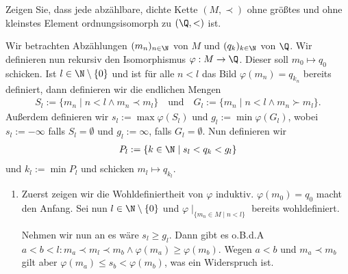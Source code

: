 \begin{exercise}
    Zeigen Sie, dass jede abzählbare, dichte Kette $(M, \prec)$ ohne größtes und ohne kleinstes Element ordnungsisomorph zu $(\Q, <)$ ist.
\end{exercise}
\begin{solution}
    Wir betrachten Abzählungen $(m_n)_{n \in \N}$ von $M$ und $(q_k)_{k \in \N}$ von $\Q$. Wir definieren nun rekursiv den Isomorphismus $\varphi: M \to \Q$. Dieser soll $m_0 \mapsto q_0$ schicken. Ist $l \in \N \setminus \{0\}$ und ist für alle $n < l$ das Bild $\varphi(m_n) = q_{k_n}$ bereits definiert, dann definieren wir die endlichen Mengen
    \begin{align*}
        S_l := \{m_n \mid n < l \land m_n \prec m_l \} \quad \textrm{und} \quad G_l := \{m_n \mid n < l \land m_n \succ m_l \}.
    \end{align*}
    Außerdem definieren wir $s_l := \max \varphi(S_l)$ und $g_l := \min \varphi(G_l)$, wobei $s_l := -\infty$ falls $S_l = \emptyset$ und $g_l := \infty$, falls $G_l = \emptyset$. Nun definieren wir
    \begin{align*}
        P_l := \{k \in \N \mid s_l < q_k < g_l \}
    \end{align*}
    und $k_l := \min P_l$ und schicken $m_l \mapsto q_{k_l}$.
    \begin{enumerate}
        \item Zuerst zeigen wir die Wohldefiniertheit von $\varphi$ induktiv. $\varphi(m_0) = q_0$ macht den Anfang. Sei nun $l \in \N \setminus \{0\}$ und $\varphi \mid_{\{m_n \in M \mid n < l\}}$ bereits wohldefiniert.

        Nehmen wir nun an es wäre $s_l \geq g_l$. Dann gibt es o.B.d.A $a < b < l: m_a \prec m_l \prec m_b \land \varphi(m_a) \geq \varphi(m_b)$. Wegen $a < b$ und $m_a \prec m_b$ gilt aber $\varphi(m_a) \leq s_b < \varphi(m_b)$, was ein Widerspruch ist.


\end{enumerate}
\end{solution}
